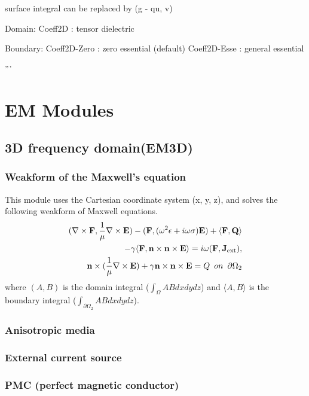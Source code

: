 \documentclass[11pt,a4paper,draft]{report}
\begin{document}
    surface integral can be replaced by (g - qu, v)
        
  Domain:   
     Coeff2D          : tensor dielectric

  Boundary:
     Coeff2D-Zero     : zero essential (default)
     Coeff2D-Esse     : general essential

'''
\chapter{EM Modules}
\section{3D frequency domain(EM3D)}
\subsection{Weakform of the Maxwell's equation}
This module uses the Cartesian coordinate system (x, y, z), and solves the following weakform of Maxwell equations. 
 \begin{align}
(\nabla \times \mathbf{F},  \frac{1}{\mu}\nabla  \times  \mathbf{E})
 - (\mathbf{F},  (\omega^2 \epsilon+ i \omega \sigma)  \mathbf{E}) 
 +  \langle \mathbf{F},  \mathbf{Q} \rangle 
 \notag \\
 - \gamma \langle  \mathbf{F}, \mathbf{n} \times \mathbf{n} \times  \mathbf{E}\rangle = i \omega (\mathbf{F}, \mathbf{J}_{\rm ext} ) ,
\label{em3d_weak} \\
 \mathbf{n} \times (\frac{1}{\mu} \nabla \times \mathbf{E}) + \gamma \mathbf{n} \times \mathbf{n} \times  \mathbf{E} = Q\,\,\,on\,\,\,\partial \Omega_{2}
 \end{align}
  where $(A , B)$ is the domain integral ($\int_{\Omega} AB dxdydz$) and $\langle A, B \rangle $ is the boundary integral ($\int_{\partial \Omega_{2}} ABdxdydz$). 
 
 \subsection{Anisotropic media}
 
 \subsection{External current source}
 
 \subsection{PMC (perfect magnetic conductor)}
 
\end{document}
